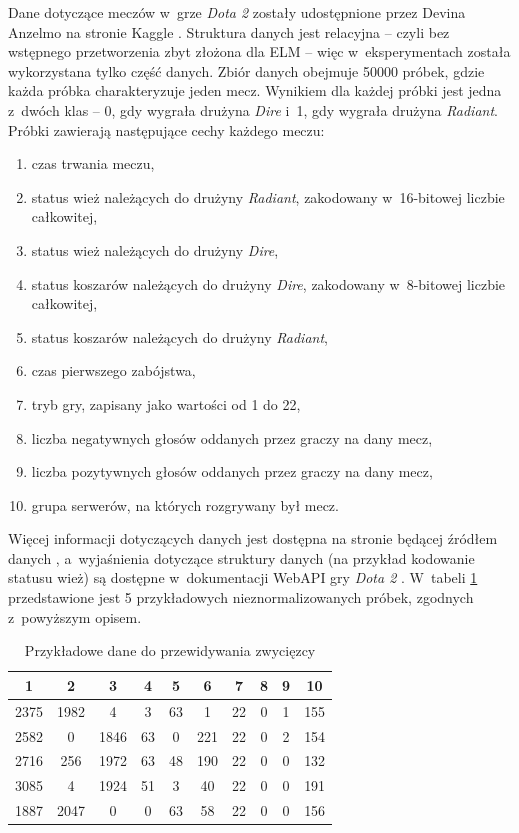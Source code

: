 \documentclass{article}
\begin{document}
Dane dotyczące meczów w~grze \textit{Dota 2} zostały udostępnione przez Devina Anzelmo na stronie Kaggle \cite{dota2}. Struktura danych jest relacyjna -- czyli bez wstępnego przetworzenia zbyt złożona dla ELM -- więc w~eksperymentach została wykorzystana tylko część danych. Zbiór danych obejmuje 50000 próbek, gdzie każda próbka charakteryzuje jeden mecz.  Wynikiem dla każdej próbki jest jedna z~dwóch klas -- 0, gdy wygrała drużyna \textit{Dire} i~1, gdy wygrała drużyna \textit{Radiant}. Próbki zawierają następujące cechy każdego meczu:
\begin{enumerate}
\item czas trwania meczu,
\item status wież należących do drużyny \textit{Radiant}, zakodowany w~16-bitowej liczbie całkowitej,
\item status wież należących do drużyny \textit{Dire},
\item status koszarów należących do drużyny \textit{Dire}, zakodowany w~8-bitowej liczbie całkowitej,
\item status koszarów należących do drużyny \textit{Radiant},
\item czas pierwszego zabójstwa,
\item tryb gry, zapisany jako wartości od 1 do 22,
\item liczba negatywnych głosów oddanych przez graczy na dany mecz,
\item liczba pozytywnych głosów oddanych przez graczy na dany mecz,
\item grupa serwerów, na których rozgrywany był mecz.
\end{enumerate}
Więcej informacji dotyczących danych jest dostępna na stronie będącej źródłem danych \cite{dota2}, a~wyjaśnienia dotyczące struktury danych (na przykład kodowanie statusu wież) są dostępne w~dokumentacji WebAPI gry \textit{Dota 2} \cite{dota2_webapi}. W~tabeli \ref{dota2_first_5} przedstawione jest 5 przykładowych nieznormalizowanych próbek, zgodnych z~powyższym opisem.
\begin{table}[H]
\caption{Przykładowe dane do przewidywania zwycięzcy}
\label{dota2_first_5}
\centering
\begin{tabular}{|c|c|c|c|c|c|c|c|c|c|}
\hline
\textbf{1} & \textbf{2} & \textbf{3} & \textbf{4} & \textbf{5} & \textbf{6} & \textbf{7} & \textbf{8} & \textbf{9} & \textbf{10} \\
\hline
2375 & 1982 & 4 & 3 & 63 & 1 & 22 & 0 & 1 & 155 \\
2582 & 0 & 1846 & 63 & 0 & 221 & 22 & 0 & 2 & 154 \\
2716 & 256 & 1972 & 63 & 48 & 190 & 22 & 0 & 0 & 132 \\
3085 & 4 & 1924 & 51 & 3 & 40 & 22 & 0 & 0 & 191 \\
1887 & 2047 & 0 & 0 & 63 & 58 & 22 & 0 & 0 & 156 \\
\hline
\end{tabular}
\end{table}
\end{document}
